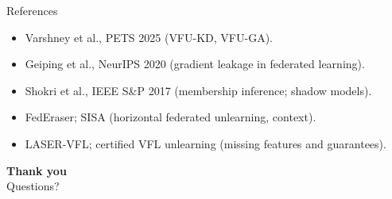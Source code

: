\documentclass[aspectratio=169, 11pt]{beamer}
\begin{document}
\begin{frame}{References}
  \footnotesize
  \begin{itemize}
    \item Varshney et al., PETS 2025 (\textsc{VFU-KD}, \textsc{VFU-GA}).
    \item Geiping et al., NeurIPS 2020 (gradient leakage in federated learning).
    \item Shokri et al., IEEE S\&P 2017 (membership inference; shadow models).
    \item FedEraser; SISA (horizontal federated unlearning, context).
    \item LASER-VFL; certified VFL unlearning (missing features and guarantees).
  \end{itemize}
\end{frame}

\begin{frame}{}
  \centering
  {\Large \textbf{Thank you}}\\[0.9em]
  Questions?
\end{frame}
\end{document}
